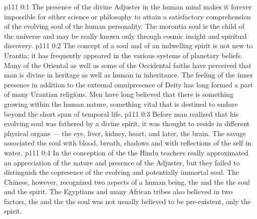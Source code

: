 \author{Solitary Messenger}
\vs p111 0:1 The presence of the divine Adjuster in the human mind makes it forever impossible for either science or philosophy to attain a satisfactory comprehension of the evolving soul of the human personality. The morontia soul is the child of the universe and may be really known only through cosmic insight and spiritual discovery.
\vs p111 0:2 \pc The concept of a soul and of an indwelling spirit is not new to Urantia; it has frequently appeared in the various systems of planetary beliefs. Many of the Oriental as well as some of the Occidental faiths have perceived that man is divine in heritage as well as human in inheritance. The feeling of the inner presence in addition to the external omnipresence of Deity has long formed a part of many Urantian religions. Men have long believed that there is something growing within the human nature, something vital that is destined to endure beyond the short span of temporal life.
\vs p111 0:3 Before man realized that his evolving soul was fathered by a divine spirit, it was thought to reside in different physical organs --- the eye, liver, kidney, heart, and later, the brain. The savage associated the soul with blood, breath, shadows and with reflections of the self in water.
\vs p111 0:4 In the conception of the  the Hindu teachers really approximated an appreciation of the nature and presence of the Adjuster, but they failed to distinguish the copresence of the evolving and potentially immortal soul. The Chinese, however, recognized two aspects of a human being, the  and the  the soul and the spirit. The Egyptians and many African tribes also believed in two factors, the  and the  the soul was not usually believed to be pre\hyp{}existent, only the spirit.
